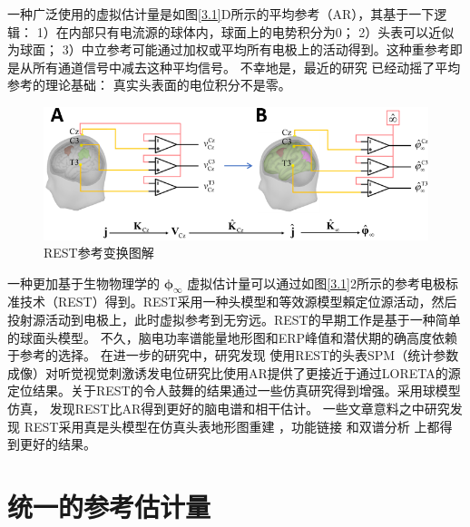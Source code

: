 一种广泛使用的虚拟估计量是如图\ref{3.1}D所示的平均参考（AR），其基于一下逻辑：
1）在内部只有电流源的球体内，球面上的电势积分为0； 2）头表可以近似为球面； 3）中立参考可能通过加权或平均所有电极上的活动得到。这种重参考即是从所有通道信号中减去这种平均信号。
不幸地是，最近的研究 已经动摇了平均参考的理论基础： 真实头表面的电位积分不是零。
\begin{figure}[!ht]
	\centering
	\includegraphics[width=15cm]{pic/Frontier/figure2.png}
	\caption{REST参考变换图解}
	\label{3.2}
\end{figure}
一种更加基于生物物理学的 $\mathbf{\phi}_{\infty}$ 虚拟估计量可以通过如图\ref{3.1}2所示的参考电极标准技术（REST）得到。REST采用一种头模型和等效源模型賴定位源活动，然后投射源活动到电极上，此时虚拟参考到无穷远。REST的早期工作是基于一种简单的球面头模型。 不久，脑电功率谱能量地形图和ERP峰值和潜伏期的确高度依赖于参考的选择。 在进一步的研究中，研究发现 使用REST的头表SPM（统计参数成像）对听觉视觉刺激诱发电位研究比使用AR提供了更接近于通过LORETA的源定位结果。关于REST的令人鼓舞的结果通过一些仿真研究得到增强。采用球模型仿真，
 发现REST比AR得到更好的脑电谱和相干估计。 一些文章意料之中研究发现 REST采用真是头模型在仿真头表地形图重建 ，功能链接 
和双谱分析  上都得到更好的结果。

\section{统一的参考估计量}
